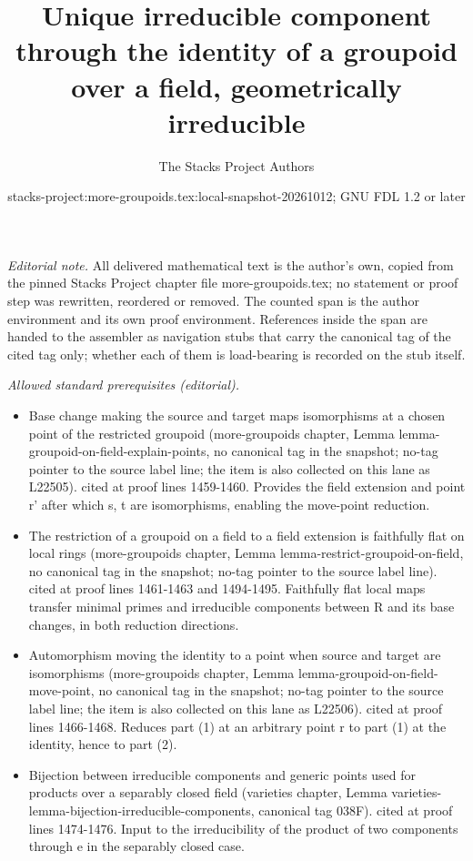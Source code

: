 \documentclass{stacks-project}
\title{Unique irreducible component through the identity of a groupoid over a field, geometrically irreducible}
\author{The Stacks Project Authors}
\date{stacks-project:more-groupoids.tex:local-snapshot-20261012; GNU FDL 1.2 or later}
\theoremstyle{plain}
\theoremstyle{definition}
\theoremstyle{remark}
\numberwithin{equation}{subsection}
\begin{document}
\maketitle
\setcounter{subsection}{1}
\noindent\textit{Editorial note.} All delivered mathematical text is the author's own, copied from the pinned Stacks Project chapter file more-groupoids.tex; no statement or proof step was rewritten, reordered or removed. The counted span is the author environment and its own proof environment. References inside the span are handed to the assembler as navigation stubs that carry the canonical tag of the cited tag only; whether each of them is load-bearing is recorded on the stub itself.\par\medskip
\noindent\textit{Allowed standard prerequisites (editorial).}\begin{itemize}
\item Base change making the source and target maps isomorphisms at a chosen point of the restricted groupoid (more-groupoids chapter, Lemma lemma-groupoid-on-field-explain-points, no canonical tag in the snapshot; no-tag pointer to the source label line; the item is also collected on this lane as L22505). cited at proof lines 1459-1460. Provides the field extension and point r' after which s, t are isomorphisms, enabling the move-point reduction.
\item The restriction of a groupoid on a field to a field extension is faithfully flat on local rings (more-groupoids chapter, Lemma lemma-restrict-groupoid-on-field, no canonical tag in the snapshot; no-tag pointer to the source label line). cited at proof lines 1461-1463 and 1494-1495. Faithfully flat local maps transfer minimal primes and irreducible components between R and its base changes, in both reduction directions.
\item Automorphism moving the identity to a point when source and target are isomorphisms (more-groupoids chapter, Lemma lemma-groupoid-on-field-move-point, no canonical tag in the snapshot; no-tag pointer to the source label line; the item is also collected on this lane as L22506). cited at proof lines 1466-1468. Reduces part (1) at an arbitrary point r to part (1) at the identity, hence to part (2).
\item Bijection between irreducible components and generic points used for products over a separably closed field (varieties chapter, Lemma varieties-lemma-bijection-irreducible-components, canonical tag 038F). cited at proof lines 1474-1476. Input to the irreducibility of the product of two components through e in the separably closed case.

\end{itemize}
\end{document}
